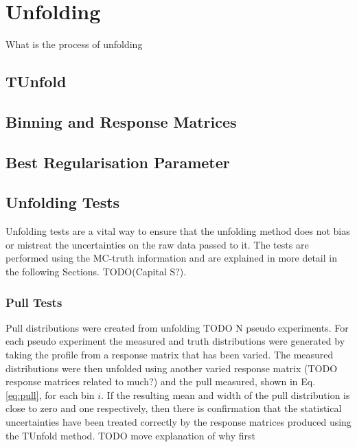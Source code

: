 \section{Unfolding}
\label{sec:unfold}

What is the process of unfolding

\subsection{TUnfold}
\label{ssec:TUnfold}

\subsection{Binning and Response Matrices}
\label{ssec:bin}

\subsection{Best Regularisation Parameter}
\label{ssec:bestTau}

\subsection{Unfolding Tests}
\label{ssec:uTests}

Unfolding tests are a vital way to ensure that the unfolding method does not bias or mistreat the uncertainties on the raw data passed to it. The tests are performed using the MC-truth information and are explained in more detail in the following Sections. TODO(Capital S?). 


\subsubsection{Pull Tests}
\label{sssec:pulls}

	Pull distributions were created from unfolding TODO N pseudo experiments. For each pseudo experiment the measured and truth distributions were generated by taking the profile from a response matrix that has been varied. The measured distributions were then unfolded using another varied response matrix (TODO response matrices related to much?) and the pull measured, shown in Eq. \ref{eq:pull}, for each bin $i$. If the resulting mean and width of the pull distribution is close to zero and one respectively, then there is confirmation that the statistical uncertainties have been treated correctly by the response matrices produced using the TUnfold method. TODO move explanation of why first


